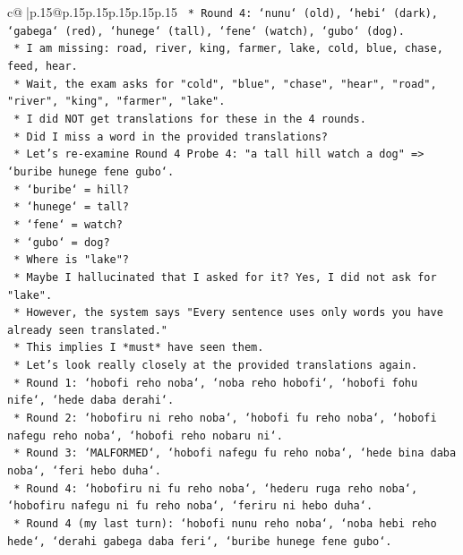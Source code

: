 \documentclass{article}
\begin{document}
{\begin{supertabular}{c@{$\;$}|p{.15\linewidth}@{}p{.15\linewidth}p{.15\linewidth}p{.15\linewidth}p{.15\linewidth}p{.15\linewidth}}
{{{\texttt{            *   Round 4: `nunu` (old), `hebi` (dark), `gabega` (red), `hunege` (tall), `fene` (watch), `gubo` (dog).} \\
\texttt{            *   I am missing: road, river, king, farmer, lake, cold, blue, chase, feed, hear.} \\
\texttt{            *   Wait, the exam asks for "cold", "blue", "chase", "hear", "road", "river", "king", "farmer", "lake".} \\
\texttt{            *   I did NOT get translations for these in the 4 rounds.} \\
\texttt{            *   Did I miss a word in the provided translations?} \\
\texttt{            *   Let's re{-}examine Round 4 Probe 4: "a tall hill watch a dog" => `buribe hunege fene gubo`.} \\
\texttt{                *   `buribe` = hill?} \\
\texttt{                *   `hunege` = tall?} \\
\texttt{                *   `fene` = watch?} \\
\texttt{                *   `gubo` = dog?} \\
\texttt{            *   Where is "lake"?} \\
\texttt{            *   Maybe I hallucinated that I asked for it? Yes, I did not ask for "lake".} \\
\texttt{            *   However, the system says "Every sentence uses only words you have already seen translated."} \\
\texttt{            *   This implies I *must* have seen them.} \\
\texttt{            *   Let's look really closely at the provided translations again.} \\
\texttt{            *   Round 1: `hobofi reho noba`, `noba reho hobofi`, `hobofi fohu nife`, `hede daba derahi`.} \\
\texttt{            *   Round 2: `hobofiru ni reho noba`, `hobofi fu reho noba`, `hobofi nafegu reho noba`, `hobofi reho nobaru ni`.} \\
\texttt{            *   Round 3: `MALFORMED`, `hobofi nafegu fu reho noba`, `hede bina daba noba`, `feri hebo duha`.} \\
\texttt{            *   Round 4: `hobofiru ni fu reho noba`, `hederu ruga reho noba`, `hobofiru nafegu ni fu reho noba`, `feriru ni hebo duha`.} \\
\texttt{            *   Round 4 (my last turn): `hobofi nunu reho noba`, `noba hebi reho hede`, `derahi gabega daba feri`, `buribe hunege fene gubo`.} \\
}}}
\end{supertabular}}
\end{document}
